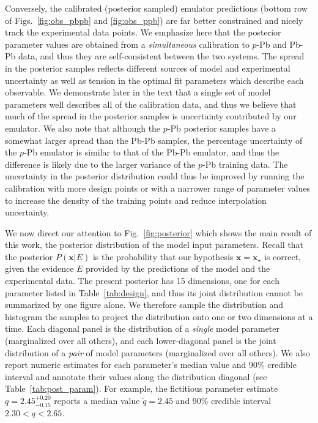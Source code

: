 \documentclass[aps,prc,reprint,amsmath,nofootinbib]{revtex4-1}
\newcommand{\xv}{\mathbf x}
\begin{document}
Conversely, the calibrated (posterior sampled) emulator predictions (bottom row of Figs.~\ref{fig:obs_pbpb} and \ref{fig:obs_ppb}) are far better constrained and nicely track the experimental data points.
We emphasize here that the posterior parameter values are obtained from a \emph{simultaneous} calibration to $p$-Pb and Pb-Pb data, and thus they are self-consistent between the two systems.
The spread in the posterior samples reflects different sources of model and experimental uncertainty as well as tension in the optimal fit parameters which describe each observable.
We demonstrate later in the text that a single set of model parameters well describes all of the calibration data, and thus we believe that much of the spread in the posterior samples is uncertainty contributed by our emulator.
We also note that although the $p$-Pb posterior samples have a somewhat larger spread than the Pb-Pb samples, the percentage uncertainty of the $p$-Pb emulator is similar to that of the Pb-Pb emulator, and thus the difference is likely due to the larger variance of the $p$-Pb training data.
The uncertainty in the posterior distribution could thus be improved by running the calibration with more design points or with a narrower range of parameter values to increase the density of the training points and reduce interpolation uncertainty.

We now direct our attention to Fig.~\ref{fig:posterior} which shows the main result of this work, the posterior distribution of the model input parameters.
Recall that the posterior $P(\xv | E)$ is the probability that our hypothesis $\xv = \xv_\star$ is correct, given the evidence $E$ provided by the predictions of the model and the experimental data.
The present posterior has 15 dimensions, one for each parameter listed in Table~\ref{tab:design}, and thus its joint distribution cannot be summarized by one figure alone.
We therefore sample the distribution and histogram the samples to project the distribution onto one or two dimensions at a time.
Each diagonal panel is the distribution of a \emph{single} model parameter (marginalized over all others), and each lower-diagonal panel is the joint distribution of a \emph{pair} of model parameters (marginalized over all others).
We also report numeric estimates for each parameter's median value and 90\% credible interval and annotate their values along the distribution diagonal (see Table~\ref{tab:post_param}).
For example, the fictitious parameter estimate $q=2.45_{-0.15}^{+0.20}$ reports a median value $\tilde{q}=2.45$ and 90\% credible interval $2.30 < q < 2.65$.
\newpage
\end{document}
